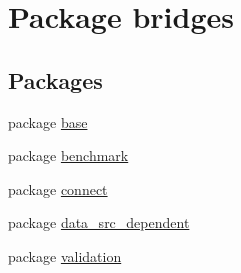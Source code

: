 \hypertarget{namespacebridges}{}\section{Package bridges}
\label{namespacebridges}
\subsection*{Packages}
\begin{DoxyCompactItemize}
\item 
package \mbox{\hyperlink{namespacebridges_1_1base}{base}}
\item 
package \mbox{\hyperlink{namespacebridges_1_1benchmark}{benchmark}}
\item 
package \mbox{\hyperlink{namespacebridges_1_1connect}{connect}}
\item 
package \mbox{\hyperlink{namespacebridges_1_1data__src__dependent}{data\+\_\+src\+\_\+dependent}}
\item 
package \mbox{\hyperlink{namespacebridges_1_1validation}{validation}}
\end{DoxyCompactItemize}
